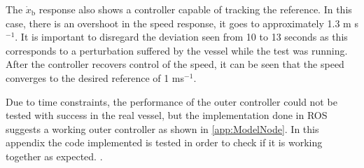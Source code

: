 The $\dot{x}_\mathrm{b}$ response also shows a controller capable of tracking the reference. In this case, there is an overshoot in the speed response, it goes to approximately 1.3 m s$^{-1}$. It is important to disregard the deviation seen from 10 to 13 seconds as this corresponds to a perturbation suffered by the vessel while the test was running. After the controller recovers control of the speed, it can be seen that the speed converges to the desired reference of 1 ms$^{-1}$. 

Due to time constraints, the performance of the outer controller could not be tested with success in the real vessel, but the implementation done in ROS suggests a working outer controller as shown in \autoref{app:ModelNode}. In this appendix the code implemented is tested in order to check if it is working together as expected. .